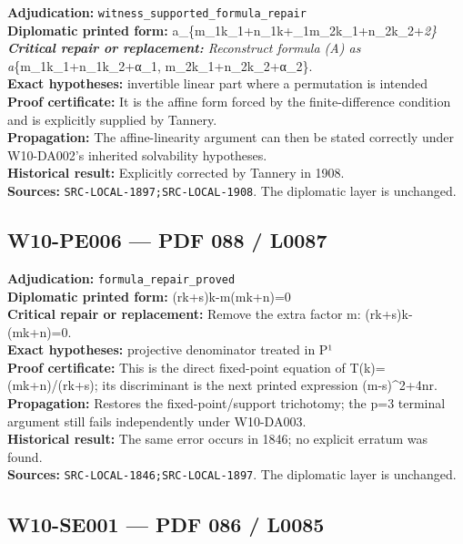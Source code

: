 \documentclass[
  10pt,
  a4paper,
]{scrreprt}
\begin{document}
\textbf{Adjudication:} \texttt{witness\_supported\_formula\_repair}\\
\textbf{Diplomatic printed form:}
a\_\{m\_1k\_1+n\_1k+\alpha\_1m\_2k\_1+n\_2k\_2+\alpha\emph{2\}\\
\textbf{Critical repair or replacement:} Reconstruct formula (A) as
a}\{m\_1k\_1+n\_1k\_2+α\_1, m\_2k\_1+n\_2k\_2+α\_2\}.\\
\textbf{Exact hypotheses:} invertible linear part where a permutation is
intended\\
\textbf{Proof certificate:} It is the affine form forced by the
finite-difference condition and is explicitly supplied by Tannery.\\
\textbf{Propagation:} The affine-linearity argument can then be stated
correctly under W10-DA002's inherited solvability hypotheses.\\
\textbf{Historical result:} Explicitly corrected by Tannery in 1908.\\
\textbf{Sources:} \texttt{SRC-LOCAL-1897;SRC-LOCAL-1908}. The diplomatic
layer is unchanged.

\subsection{W10-PE006 --- PDF 088 /
L0087}\label{w10-pe006-pdf-088-l0087}

\textbf{Adjudication:} \texttt{formula\_repair\_proved}\\
\textbf{Diplomatic printed form:} (rk+s)k-m(mk+n)=0\\
\textbf{Critical repair or replacement:} Remove the extra factor m:
(rk+s)k-(mk+n)=0.\\
\textbf{Exact hypotheses:} projective denominator treated in P¹\\
\textbf{Proof certificate:} This is the direct fixed-point equation of
T(k)=(mk+n)/(rk+s); its discriminant is the next printed expression
(m-s)\^{}2+4nr.\\
\textbf{Propagation:} Restores the fixed-point/support trichotomy; the
p=3 terminal argument still fails independently under W10-DA003.\\
\textbf{Historical result:} The same error occurs in 1846; no explicit
erratum was found.\\
\textbf{Sources:} \texttt{SRC-LOCAL-1846;SRC-LOCAL-1897}. The diplomatic
layer is unchanged.

\subsection{W10-SE001 --- PDF 086 /
L0085}\label{w10-se001-pdf-086-l0085}
\end{document}
